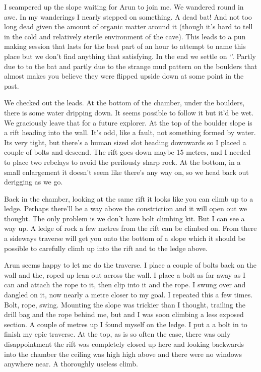 I scampered up the slope waiting for Arun to join me. We wandered round in awe. In my wanderings I nearly stepped on something. A dead bat! And not too long dead given the amount of organic matter around it (though it's hard to tell in the cold and relatively sterile environment of the cave). This leads to a pun making session that lasts for the best part of an hour to attempt to name this place but we don't find anything that satisfying. In the end we settle on `'. Partly due to to the bat and partly due to the strange mud pattern on the boulders that almost makes you believe they were flipped upside down at some point in the past.

We checked out the leads. At the bottom of the chamber, under the boulders, there is some water dripping down. It seems possible to follow it but it'd be wet. We graciously leave that for a future explorer. At the top of the boulder slope is a rift heading into the wall. It's odd, like a fault, not something formed by water. Its very tight, but there's a human sized slot heading downwards so I placed a couple of bolts and descend. The rift goes down maybe 15 metres, and I needed to place two rebelays to avoid the perilously sharp rock. At the bottom, in a small enlargement it doesn't seem like there's any way on, so we head back out derigging as we go. 

Back in the chamber, looking at the same rift it looks like you can climb up to a ledge. Perhaps there'll be a way above the constriction and it will open out we thought. The only problem is we don't have bolt climbing kit. But I can see a way up. A ledge of rock a few metres from the rift can be climbed on. From there a sideways traverse will get you onto the bottom of a slope which it should be possible to carefully climb up into the rift and to the ledge above. 

Arun seems happy to let me do the traverse. I place a couple of bolts back on the wall and the, roped up lean out across the wall. I place a bolt as far away as I can and attach the rope to it, then clip into it and the rope. I swung over and dangled on it, now nearly a metre closer to my goal. I repeated this a few times. Bolt, rope, swing. Mounting the slope was trickier than I thought, trailing the drill bag and the rope behind me, but  and I was soon climbing a less exposed section. A couple of metres up I found myself on the ledge. I put a a bolt in to finish my epic traverse. At the top, as is so often the case, there was only disappointment the rift was completely closed up here and looking backwards into the chamber the ceiling was high high above and there were no windows anywhere near. A thoroughly useless climb. 


